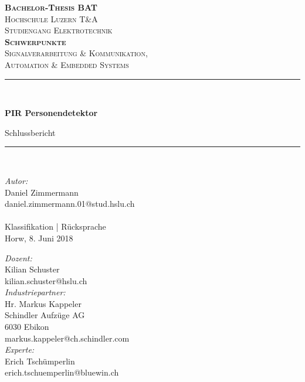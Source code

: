 \begin{titlepage}	
	\begin{center}	
		
		\textsc{\bfseries \LARGE Bachelor-Thesis BAT }\\[1.0cm]
		
		\textsc{\Large Hochschule Luzern T\&A}\\[0.5cm]
		
		\textsc{Studiengang Elektrotechnik}\\[1.0cm]
		
				\textsc{\bfseries Schwerpunkte}\\[0.2cm]
		
		\textsc{	Signalverarbeitung \& Kommunikation, \\
			Automation \& Embedded Systems}\\[0.5cm]
		
		\newcommand{\HRule}{\rule{\linewidth}{0.5mm}}
		\HRule \\[1.0cm]
		{   \Huge \bfseries PIR Personendetektor\\
			\large \vspace{\baselineskip}
			
			\large Schlussbericht\\[1.0cm]
			
			\HRule \\[1.0cm]
			\large \vspace{\baselineskip}
		}
		\begingroup
		\parfillskip=0pt
		\large
		
		\begin{minipage}[t]{0.48\textwidth}
			\raggedright						
			\emph{Autor:}\\
			Daniel Zimmermann\\
			daniel.zimmermann.01@stud.hslu.ch\\
			\hfill \break
			\\[4.4cm]
			{\large Klassifikation | Rücksprache\\ 
				Horw, 
				8. Juni 2018}
		\end{minipage}%
		\hfill
		\begin{minipage}[t]{0.48\textwidth}
			\raggedleft
			\emph{Dozent:} \\
			Kilian Schuster \\
			kilian.schuster@hslu.ch\\[1.0cm]
			\emph{Industriepartner:} \\
			Hr. Markus Kappeler \\
			Schindler Aufzüge AG \\
			6030 Ebikon\\
			markus.kappeler@ch.schindler.com\\[1.0cm]
			\emph{Experte:}\\
			Erich Tschümperlin\\
			erich.tschuemperlin@bluewin.ch\\
		\end{minipage}%
		\par\endgroup
		\hfill
		
	\end{center}	
\end{titlepage}
